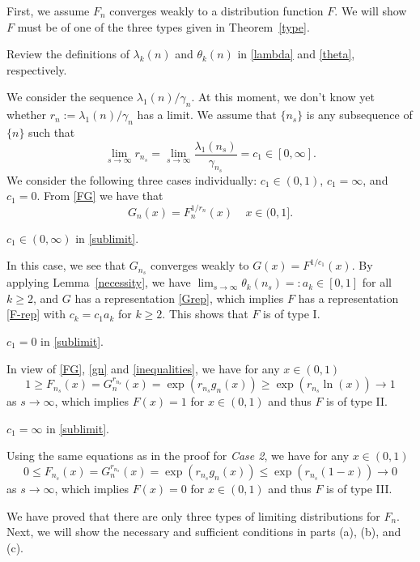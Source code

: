 \documentclass[11pt]{article}
\numberwithin{equation}{section}
\begin{document}
\vspace{10pt}

 First, we assume $F_n$
converges weakly to a distribution function $F$. We will show $F$
must be of one of the three types given in Theorem~\ref{type}.

Review the definitions of $\lambda_k(n)$ and $\theta_k(n)$ in
\eqref{lambda} and \eqref{theta}, respectively.

We consider the sequence $\lambda_1(n)/\gamma_n$. At this moment, we
don't know yet whether $ r_n:=\lambda_1(n)/\gamma_n$ has a limit. We
assume that $\{n_s\}$ is any subsequence of $\{n\}$ such that
\begin{equation}\label{sublimit}
\lim_{s\to\infty}
r_{n_s}=\lim_{s\to\infty}\frac{\lambda_1(n_s)}{\gamma_{n_s}}=c_1\in
[0,\infty].
\end{equation}
We consider the following three cases individually:  $c_1\in (0,1)$,
$c_1=\infty$, and $c_1=0$.  From \eqref{FG} we have that
\begin{equation}\label{GF}
G_n(x)=F_n^{1/ r_n}(x)~~~~~x\in (0,1].
\end{equation}

 $c_1\in (0,\infty)$ in \eqref{sublimit}.

In this case,  we see that $G_{n_s}$ converges weakly to
$G(x)=F^{1/c_1}(x)$.  By applying Lemma~\ref{necessity}, we have
$\lim_{s\to\infty}\theta_k(n_s)=:a_k\in[0,1]$ for all $k\ge 2$, and
$G$ has a representation \eqref{Grep}, which implies  $F$ has a
representation \eqref{F-rep} with $c_k=c_1a_k$ for $k\ge 2$.  This
shows that $F$ is of type I.

 $c_1=0$ in \eqref{sublimit}.

In view of \eqref{FG}, \eqref{gn} and \eqref{inequalities}, we have
for any $x\in (0,1)$
\[
1\ge F_{n_s}(x)=G_n^{ r_{n_s}}(x)=\exp( r_{n_s}g_n(x))\ge \exp(
r_{n_s}\ln(x))\to 1
\]
as $s\to\infty$, which implies $F(x)=1$ for $x\in (0,1)$ and thus
$F$ is of type II.

 $c_1=\infty$ in \eqref{sublimit}.

Using the same equations as in the proof for {\it Case 2}, we have
for any $x\in (0,1)$
\[
0\le F_{n_s}(x)=G_n^{ r_{n_s}}(x)=\exp( r_{n_s}g_n(x))\le \exp(
r_{n_s}(1-x))\to 0
\]
as $s\to\infty$, which implies $F(x)=0$ for $x\in (0,1)$ and thus
$F$ is of type III.


We have proved that there are only three types of limiting
distributions for $F_n$.   Next, we will show the necessary and
sufficient conditions in parts (a), (b), and (c).
\end{document}
